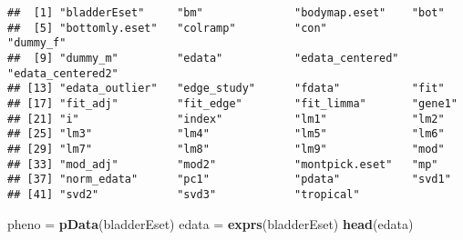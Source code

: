 \documentclass[]{article}
\newenvironment{Shaded}{\begin{snugshade}}{\end{snugshade}}
\newcommand{\KeywordTok}[1]{\textcolor[rgb]{0.13,0.29,0.53}{\textbf{#1}}}
\newcommand{\StringTok}[1]{\textcolor[rgb]{0.31,0.60,0.02}{#1}}
\newcommand{\NormalTok}[1]{#1}
\begin{document}
\begin{verbatim}
##  [1] "bladderEset"     "bm"              "bodymap.eset"    "bot"            
##  [5] "bottomly.eset"   "colramp"         "con"             "dummy_f"        
##  [9] "dummy_m"         "edata"           "edata_centered"  "edata_centered2"
## [13] "edata_outlier"   "edge_study"      "fdata"           "fit"            
## [17] "fit_adj"         "fit_edge"        "fit_limma"       "gene1"          
## [21] "i"               "index"           "lm1"             "lm2"            
## [25] "lm3"             "lm4"             "lm5"             "lm6"            
## [29] "lm7"             "lm8"             "lm9"             "mod"            
## [33] "mod_adj"         "mod2"            "montpick.eset"   "mp"             
## [37] "norm_edata"      "pc1"             "pdata"           "svd1"           
## [41] "svd2"            "svd3"            "tropical"
\end{verbatim}

\begin{Shaded}
\begin{Highlighting}[]
\NormalTok{pheno =}\StringTok{ }\KeywordTok{pData}\NormalTok{(bladderEset)}
\NormalTok{edata =}\StringTok{ }\KeywordTok{exprs}\NormalTok{(bladderEset)}
\KeywordTok{head}\NormalTok{(edata)}
\end{Highlighting}
\end{Shaded}
\end{document}
